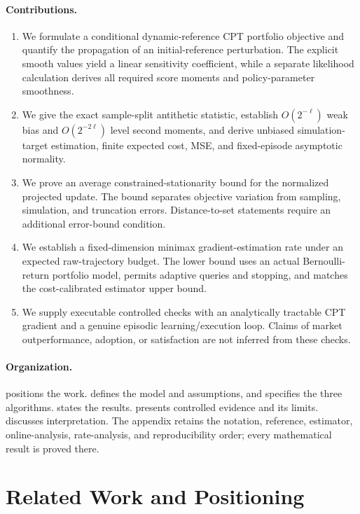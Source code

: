 \documentclass[11pt]{article}
\newcommand{\1}{\mathbf 1}
\theoremstyle{definition}
\begin{document}
\paragraph{Contributions.}
\begin{enumerate}
\item We formulate a conditional dynamic-reference CPT portfolio objective and quantify the propagation of an initial-reference perturbation. The explicit smooth values yield a linear sensitivity coefficient, while a separate likelihood calculation derives all required score moments and policy-parameter smoothness.
\item We give the exact sample-split antithetic statistic, establish $O(2^{-\ell})$ weak bias and $O(2^{-2\ell})$ level second moments, and derive unbiased simulation-target estimation, finite expected cost, MSE, and fixed-episode asymptotic normality.
\item We prove an average constrained-stationarity bound for the normalized projected update. The bound separates objective variation from sampling, simulation, and truncation errors. Distance-to-set statements require an additional error-bound condition.
\item We establish a fixed-dimension minimax gradient-estimation rate under an expected raw-trajectory budget. The lower bound uses an actual Bernoulli-return portfolio model, permits adaptive queries and stopping, and matches the cost-calibrated estimator upper bound.
\item We supply executable controlled checks with an analytically tractable CPT gradient and a genuine episodic learning/execution loop. Claims of market outperformance, adoption, or satisfaction are not inferred from these checks.
\end{enumerate}

\paragraph{Organization.}
 positions the work.  defines the model and assumptions, and  specifies the three algorithms.  states the results.  presents controlled evidence and its limits.  discusses interpretation. The appendix retains the notation, reference, estimator, online-analysis, rate-analysis, and reproducibility order; every mathematical result is proved there.

\section{Related Work and Positioning}\label{sec:related}
\end{document}
